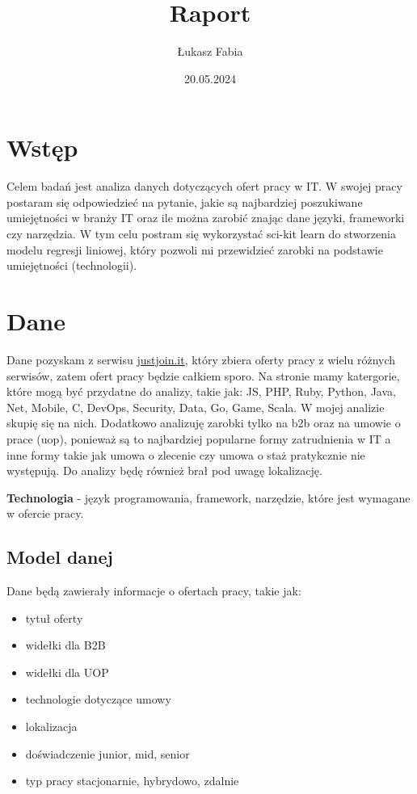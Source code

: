 \documentclass[a4paper]{article}
\title{Raport}
\author{Łukasz Fabia}
\date{20.05.2024}
\begin{document}
\maketitle
\tableofcontents

\section{Wstęp}

\quad Celem badań jest analiza danych dotyczących ofert pracy w IT. W swojej pracy postaram się
odpowiedzieć na pytanie, jakie są najbardziej poszukiwane umiejętności w branży IT oraz ile można zarobić
znając dane języki, frameworki czy narzędzia. W tym celu postram się wykorzystać sci-kit learn do stworzenia
modelu regresji liniowej, który pozwoli mi przewidzieć zarobki na podstawie umiejętności (technologii).


\section{Dane}

\quad Dane pozyskam z serwisu \href{https://justjoin.it/}{justjoin.it}, który zbiera oferty pracy z wielu różnych serwisów, zatem
ofert pracy będzie całkiem sporo. Na stronie mamy katergorie, które mogą być przydatne do analizy, takie jak:
JS, PHP, Ruby, Python, Java, Net, Mobile, C, DevOps, Security, Data, Go, Game, Scala. W mojej analizie skupię się na nich.
\quad Dodatkowo analizuję zarobki tylko na b2b oraz na umowie o prace (uop), ponieważ są to najbardziej popularne formy zatrudnienia w IT a inne formy takie jak umowa
o zlecenie czy umowa o staż pratykcznie nie występują. Do analizy będę również brał pod uwagę lokalizację.

\textbf{\newline Technologia} - język programowania, framework, narzędzie, które jest wymagane w ofercie pracy.

\subsection{Model danej}
\quad Dane będą zawierały informacje o ofertach pracy, takie jak:
\begin{itemize}
    \item tytuł oferty
    \item widełki dla B2B
    \item widełki dla UOP
    \item technologie dotyczące umowy
    \item lokalizacja
    \item doświadczenie {junior, mid, senior}
    \item typ pracy {stacjonarnie, hybrydowo, zdalnie}
\end{itemize}
\end{document}

